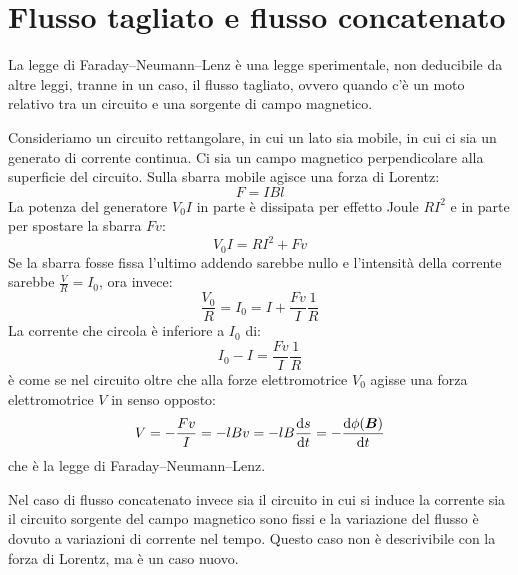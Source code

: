 \section{Flusso tagliato e flusso concatenato}
La legge di Faraday--Neumann--Lenz è una legge sperimentale, non deducibile da altre leggi, tranne in un caso, il flusso tagliato, ovvero quando c'è un moto relativo tra un circuito e una sorgente di campo magnetico.

Consideriamo un circuito rettangolare, in cui un lato sia mobile, in cui ci sia un generato di corrente continua. Ci sia un campo magnetico perpendicolare alla superficie del circuito. Sulla sbarra mobile agisce una forza di Lorentz:
\begin{equation}
F=IBl
\end{equation}
La potenza del generatore $V_0I$ in parte è dissipata per effetto Joule $RI^2$ e in parte per spostare la sbarra $Fv$:
\begin{equation}
V_0I = RI^2+Fv
\end{equation}
Se la sbarra fosse fissa l'ultimo addendo sarebbe nullo e l'intensità della corrente sarebbe $\frac{V}{R}=I_0$, ora invece:
\begin{equation}
\frac{V_0}{R}=I_0=I+\frac{Fv}{I}\frac{1}{R}
\end{equation}
La corrente che circola è inferiore a $I_0$ di:
\begin{equation}
I_0-I=\frac{Fv}{I}\frac{1}{R}
\end{equation}
è come se nel circuito oltre che alla forze elettromotrice $V_0$ agisse una forza elettromotrice $V$ in senso opposto:
\begin{equation}
V=-\frac{Fv}{I}=-lBv=-lB\frac{\mathrm{d} s}{\mathrm{d} t}=-\frac{\mathrm{d} \phi(\boldsymbol{B})}{\mathrm{d} t}
\end{equation}
che è la legge di Faraday--Neumann--Lenz.

Nel caso di flusso concatenato invece sia il circuito in cui si induce la corrente sia il circuito sorgente del campo magnetico sono fissi e la variazione del flusso è dovuto a variazioni di corrente nel tempo. Questo caso non è descrivibile con la forza di Lorentz, ma è un caso nuovo.
